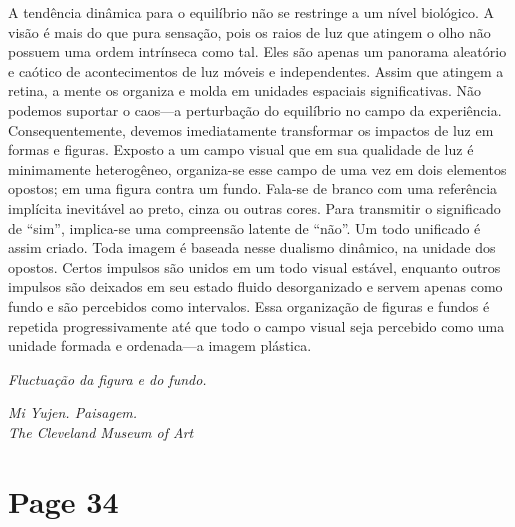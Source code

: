 \documentclass[a4paper]{article}
\begin{document}
A tendência dinâmica para o equilíbrio não se restringe a um nível biológico. A visão é mais do que pura sensação, pois os raios de luz que atingem o olho não possuem uma ordem intrínseca como tal. Eles são apenas um panorama aleatório e caótico de acontecimentos de luz móveis e independentes. Assim que atingem a retina, a mente os organiza e molda em unidades espaciais significativas. Não podemos suportar o caos---a perturbação do equilíbrio no campo da experiência. Consequentemente, devemos imediatamente transformar os impactos de luz em formas e figuras. Exposto a um campo visual que em sua qualidade de luz é minimamente heterogêneo, organiza-se esse campo de uma vez em dois elementos opostos; em uma figura contra um fundo. Fala-se de branco com uma referência implícita inevitável ao preto, cinza ou outras cores. Para transmitir o significado de ``sim'', implica-se uma compreensão latente de ``não''. Um todo unificado é assim criado. Toda imagem é baseada nesse dualismo dinâmico, na unidade dos opostos. Certos impulsos são unidos em um todo visual estável, enquanto outros impulsos são deixados em seu estado fluido desorganizado e servem apenas como fundo e são percebidos como intervalos. Essa organização de figuras e fundos é repetida progressivamente até que todo o campo visual seja percebido como uma unidade formada e ordenada---a imagem plástica.

\par
\textit{Fluctuação da figura e do fundo.}

\par
\textit{Mi Yujen. Paisagem. \\ The Cleveland Museum of Art}

\newpage
\section*{Page 34}
\end{document}
